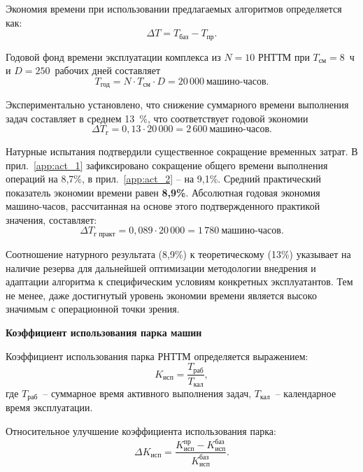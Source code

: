 Экономия времени при использовании предлагаемых алгоритмов определяется как:
\begin{equation}
	\Delta T = T_{\text{баз}} - T_{\text{пр}}.
\end{equation}

Годовой фонд времени эксплуатации комплекса из $N=10$ РНТТМ при $T_{\text{см}} = 8$~ч и $D = 250$~рабочих дней составляет
\begin{equation}
	T_{\text{год}} = N \cdot T_{\text{см}} \cdot D = 20\,000 \ \text{машино-часов}.
\end{equation}

Экспериментально установлено, что снижение суммарного времени выполнения задач составляет в среднем 13~\%, что соответствует годовой экономии
\begin{equation}
	\Delta T_{\text{г}} = 0{,}13 \cdot 20\,000 = 2\,600 \ \text{машино-часов}.
\end{equation}

Натурные испытания подтвердили существенное сокращение временных затрат. В прил.~\ref{app:act_1} зафиксировано сокращение общего времени выполнения операций на 8,7\%, в прил.~\ref{app:act_2} -- на 9,1\%. Средний практический показатель экономии времени равен \textbf{8,9\%}. Абсолютная годовая экономия машино-часов, рассчитанная на основе этого подтвержденного практикой значения, составляет:
\begin{equation}
	\Delta T_{\text{г практ}} = 0{,}089 \cdot 20\,000 = 1\,780 \ \text{машино-часов}.
\end{equation}

Соотношение натурного результата (8,9\%) к теоретическому (13\%) указывает на наличие резерва для дальнейшей оптимизации методологии внедрения и адаптации алгоритма к специфическим условиям конкретных эксплуатантов. Тем не менее, даже достигнутый уровень экономии времени является высоко значимым с операционной точки зрения.

\textbf{Коэффициент использования парка машин}

Коэффициент использования парка РНТТМ определяется выражением:
\begin{equation}
	K_{\text{исп}} = \frac{T_{\text{раб}}}{T_{\text{кал}}},
\end{equation}
где $T_{\text{раб}}$~-- суммарное время активного выполнения задач,
$T_{\text{кал}}$~-- календарное время эксплуатации.

Относительное улучшение коэффициента использования парка:
\begin{equation}
	\Delta K_{\text{исп}} =
	\frac{K_{\text{исп}}^{\text{пр}} - K_{\text{исп}}^{\text{баз}}}
	{K_{\text{исп}}^{\text{баз}}}.
\end{equation}

